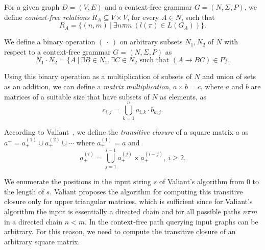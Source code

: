 For a given graph $D = (V, E)$ and a context-free grammar $G = (N, \Sigma, P)$, we define \textit{context-free relations} $R_A \subseteq V \times V$, for every $A \in N$, such that $$R_A = \{(n,m)~|~\exists n \pi m~(l(\pi) \in L(G_A))\}.$$

We define a binary operation $(~\cdot~)$ on arbitrary subsets $N_1 , N_2$ of $N$ with respect to a context-free grammar $G = (N, \Sigma, P)$ as $$N_1 \cdot N_2 = \{A~|~\exists B \in N_1, \exists C \in N_2 \text{ such that }(A \rightarrow B C) \in P\}.$$

Using this binary operation as a multiplication of subsets of $N$ and union of sets as an addition, we can define a \textit{matrix multiplication}, $a \times b = c$, where $a$ and $b$ are matrices of a suitable size that have subsets of $N$ as elements, as $$c_{i,j} = \bigcup^{n}_{k=1}{a_{i,k} \cdot b_{k,j}}.$$

According to Valiant~\cite{valiant}, we define the \textit{transitive closure} of a square matrix $a$ as $a^+ = a^{(1)}_+ \cup a^{(2)}_+ \cup \cdots$ where $a^{(1)}_+ = a$ and $$a^{(i)}_+ = \bigcup^{i-1}_{j=1}{a^{(j)}_+ \times a^{(i-j)}_+}, ~i \ge 2.$$

We enumerate the positions in the input string $s$ of Valiant's algorithm from 0 to the length of $s$. Valiant proposes the algorithm for computing this transitive closure only for upper triangular matrices, which is sufficient since for Valiant's algorithm the input is essentially a directed chain and for all possible paths $n \pi m$ in a directed chain $n < m$. In the context-free path querying input graphs can be arbitrary. For this reason, we need to compute the transitive closure of an arbitrary square matrix.


